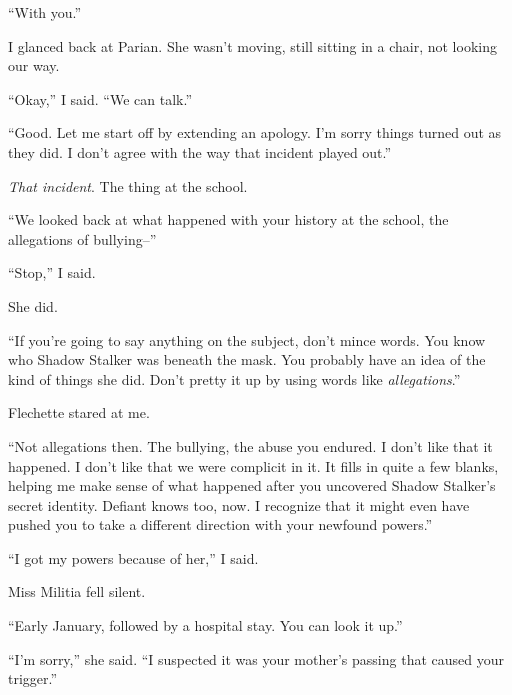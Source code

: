 ``With you.''



I glanced back at Parian.  She wasn't moving, still sitting in a chair, not looking our way.



``Okay,'' I said.  ``We can talk.''



``Good.  Let me start off by extending an apology.  I'm sorry things turned out as they did.  I don't agree with the way that incident played out.''



\emph{That incident}.  The thing at the school.



``We looked back at what happened with your history at the school, the allegations of bullying--''



``Stop,'' I said.



She did.



``If you're going to say anything on the subject, don't mince words.  You know who Shadow Stalker was beneath the mask.  You probably have an idea of the kind of things she did.  Don't pretty it up by using words like \emph{allegations}.''



Flechette stared at me.



``Not allegations then.  The bullying, the abuse you endured.  I don't like that it happened.  I don't like that we were complicit in it.  It fills in quite a few blanks, helping me make sense of what happened after you uncovered Shadow Stalker's secret identity.  Defiant knows too, now.  I recognize that it might even have pushed you to take a different direction with your newfound powers.''



``I got my powers because of her,'' I said.



Miss Militia fell silent.



``Early January, followed by a hospital stay.  You can look it up.''



``I'm sorry,'' she said.  ``I suspected it was your mother's passing that caused your trigger.''



